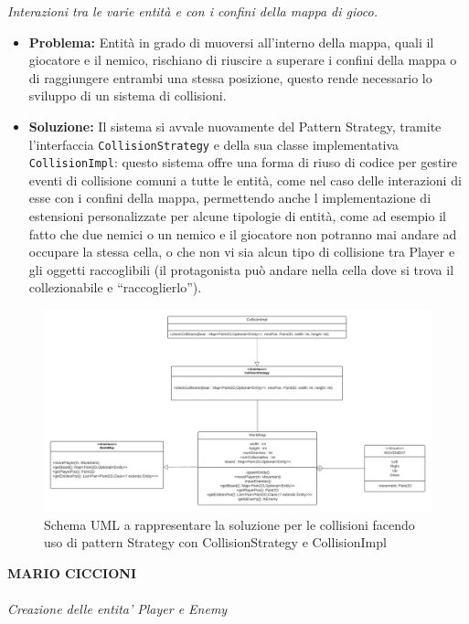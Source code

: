 \documentclass[a4paper,12pt]{report}
\begin{document}
\textit{Interazioni tra le varie entità e con i confini della mappa di gioco.}
\begin{itemize}
    \item \textbf{Problema:} Entità in grado di muoversi all’interno della mappa, quali il giocatore e il nemico, rischiano di riuscire a superare i confini della mappa o di raggiungere entrambi una stessa posizione, questo rende necessario lo sviluppo di un sistema di collisioni.
    \item \textbf{Soluzione:} Il sistema si avvale nuovamente del Pattern Strategy, tramite l’interfaccia \verb|CollisionStrategy| e della sua classe implementativa \verb|CollisionImpl|: questo sistema offre una forma di riuso di codice per gestire eventi di collisione comuni a tutte le entità, come nel caso delle interazioni di esse con i confini della mappa, permettendo anche l implementazione di estensioni personalizzate per alcune tipologie di entità, come ad esempio il fatto che due nemici o un nemico e il giocatore non potranno mai andare ad occupare la stessa cella, o che non vi sia alcun tipo di collisione tra Player e gli oggetti raccoglibili (il protagonista può andare nella cella dove si trova il collezionabile e “raccoglierlo”).
\end{itemize}
\begin{figure}[H]
\centering{}
\includegraphics[width=\textwidth,height=\textheight,keepaspectratio]{img/collisionStrategy.pdf}
\caption{Schema UML a rappresentare la soluzione per le collisioni facendo uso di pattern Strategy con CollisionStrategy e CollisionImpl}
\label{img:collisionStrategyUML}
\end{figure}
\textbf{MARIO CICCIONI}
\\ \\
\textit{Creazione delle entita' Player e Enemy}
\end{document}
